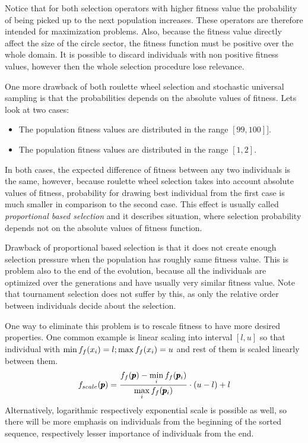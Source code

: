 Notice that for both selection operators with higher fitness value the probability of being picked up to the next population increases. These operators are therefore intended for maximization problems. Also, because the fitness value directly affect the size of the circle sector, the fitness function must be positive over the whole domain. It is possible to discard individuals with non positive fitness values, however then the whole selection procedure lose relevance.

One more drawback of both roulette wheel selection and stochastic universal sampling is that the probabilities depends on the absolute values of fitness. Lets look at two cases:
\begin{itemize}
    \item The population fitness values are distributed in the range $\left[ 99,100 \right]]$.
    \item The population fitness values are distributed in the range $\left[ 1, 2\right]$.
\end{itemize}
In both cases, the expected difference of fitness between any two individuals is the same, however, because roulette wheel selection takes into account absolute values of fitness, probability for drawing best individual from the first case is much smaller in comparison to the second case. This effect is usually called \emph{proportional based selection} and it describes situation, where selection probability depends not on the absolute values of fitness function.

Drawback of proportional based selection is that it does not create enough selection pressure when the population has roughly same fitness value. This is problem also to the end of the evolution, because all the individuals are optimized over the generations and have usually very similar fitness value. Note that tournament selection does not suffer by this, as only the relative order between individuals decide about the selection.

One way to eliminate this problem is to rescale fitness to have more desired properties. One common example is linear scaling into interval $\left[ l,u \right]$ so that individual with $\min f_f(x_i)=l; \max f_f(x_i)=u$ and rest of them is scaled linearly between them. 
$$
f_{scale}(\pmb{p})=\frac{f_f(\pmb{p}) - \min\limits_{i}f_f(\pmb{p}_i)}{\max\limits_{i}f_f(\pmb{p}_i)}\cdot(u-l)+l 
$$
Alternatively, logarithmic respectively exponential scale is possible as well, so there will be more emphasis on individuals from the beginning of the sorted sequence, respectively lesser importance of individuals from the end.

